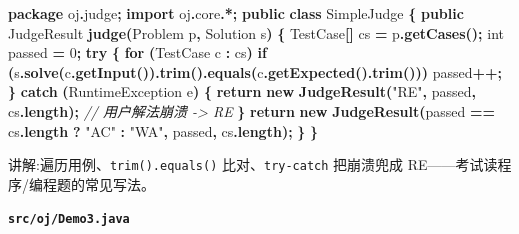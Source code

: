 \documentclass[
  11pt,
]{ctexart}
\newenvironment{Shaded}{\begin{snugshade}}{\end{snugshade}}
\newcommand{\BuiltInTok}[1]{#1}
\newcommand{\CommentTok}[1]{\textcolor[rgb]{0.56,0.35,0.01}{\textit{#1}}}
\newcommand{\ControlFlowTok}[1]{\textcolor[rgb]{0.13,0.29,0.53}{\textbf{#1}}}
\newcommand{\DataTypeTok}[1]{\textcolor[rgb]{0.13,0.29,0.53}{#1}}
\newcommand{\DecValTok}[1]{\textcolor[rgb]{0.00,0.00,0.81}{#1}}
\newcommand{\FunctionTok}[1]{\textcolor[rgb]{0.13,0.29,0.53}{\textbf{#1}}}
\newcommand{\ImportTok}[1]{#1}
\newcommand{\KeywordTok}[1]{\textcolor[rgb]{0.13,0.29,0.53}{\textbf{#1}}}
\newcommand{\NormalTok}[1]{#1}
\newcommand{\OperatorTok}[1]{\textcolor[rgb]{0.81,0.36,0.00}{\textbf{#1}}}
\newcommand{\StringTok}[1]{\textcolor[rgb]{0.31,0.60,0.02}{#1}}
\begin{document}
\begin{Shaded}
\begin{Highlighting}[]
\KeywordTok{package}\ImportTok{ oj}\OperatorTok{.}\ImportTok{judge}\OperatorTok{;}
\KeywordTok{import} \ImportTok{oj}\OperatorTok{.}\ImportTok{core}\OperatorTok{.*;}
\KeywordTok{public} \KeywordTok{class}\NormalTok{ SimpleJudge }\OperatorTok{\{}
    \KeywordTok{public}\NormalTok{ JudgeResult }\FunctionTok{judge}\OperatorTok{(}\NormalTok{Problem p}\OperatorTok{,}\NormalTok{ Solution s}\OperatorTok{)} \OperatorTok{\{}
\NormalTok{        TestCase}\OperatorTok{[]}\NormalTok{ cs }\OperatorTok{=}\NormalTok{ p}\OperatorTok{.}\FunctionTok{getCases}\OperatorTok{();}
        \DataTypeTok{int}\NormalTok{ passed }\OperatorTok{=} \DecValTok{0}\OperatorTok{;}
        \ControlFlowTok{try} \OperatorTok{\{}
            \ControlFlowTok{for} \OperatorTok{(}\NormalTok{TestCase c }\OperatorTok{:}\NormalTok{ cs}\OperatorTok{)}
                \ControlFlowTok{if} \OperatorTok{(}\NormalTok{s}\OperatorTok{.}\FunctionTok{solve}\OperatorTok{(}\NormalTok{c}\OperatorTok{.}\FunctionTok{getInput}\OperatorTok{()).}\FunctionTok{trim}\OperatorTok{().}\FunctionTok{equals}\OperatorTok{(}\NormalTok{c}\OperatorTok{.}\FunctionTok{getExpected}\OperatorTok{().}\FunctionTok{trim}\OperatorTok{()))}\NormalTok{ passed}\OperatorTok{++;}
        \OperatorTok{\}} \ControlFlowTok{catch} \OperatorTok{(}\BuiltInTok{RuntimeException}\NormalTok{ e}\OperatorTok{)} \OperatorTok{\{}
            \ControlFlowTok{return} \KeywordTok{new} \FunctionTok{JudgeResult}\OperatorTok{(}\StringTok{"RE"}\OperatorTok{,}\NormalTok{ passed}\OperatorTok{,}\NormalTok{ cs}\OperatorTok{.}\FunctionTok{length}\OperatorTok{);}   \CommentTok{// 用户解法崩溃 {-}\textgreater{} RE}
        \OperatorTok{\}}
        \ControlFlowTok{return} \KeywordTok{new} \FunctionTok{JudgeResult}\OperatorTok{(}\NormalTok{passed }\OperatorTok{==}\NormalTok{ cs}\OperatorTok{.}\FunctionTok{length} \OperatorTok{?} \StringTok{"AC"} \OperatorTok{:} \StringTok{"WA"}\OperatorTok{,}\NormalTok{ passed}\OperatorTok{,}\NormalTok{ cs}\OperatorTok{.}\FunctionTok{length}\OperatorTok{);}
    \OperatorTok{\}}
\OperatorTok{\}}
\end{Highlighting}
\end{Shaded}

讲解:遍历用例、\texttt{trim().equals()} 比对、\texttt{try-catch}
把崩溃兜成 RE------考试读程序/编程题的常见写法。

\textbf{\texttt{src/oj/Demo3.java}}
\end{document}
